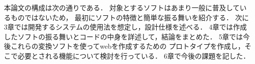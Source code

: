 本論文の構成は次の通りである．
対象とするソフトはあまり一般に普及しているものではないため，
最初にソフトの特徴と簡単な振る舞いを紹介する．
次に3章では開発するシステムの使用法を想定し，設計仕様を述べる．
4章では作成したソフトの振る舞いとコードの中身を詳述して，結論をまとめた．
5章では今後これらの変換ソフトを使ってwebを作成するための
プロトタイプを作成し，そこで必要とされる機能について検討を行っている．
6章で今後の課題を記した．

